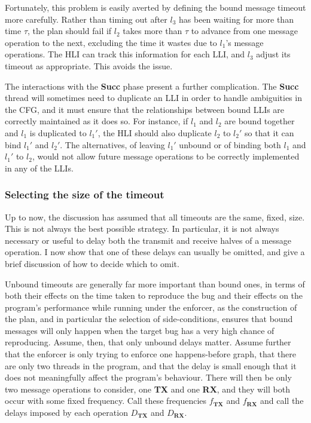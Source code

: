 Fortunately, this problem is easily averted by defining the bound
message timeout more carefully.  Rather than timing out after $l_3$
has been waiting for more than time $\tau$, the plan should fail if
$l_2$ takes more than $\tau$ to advance from one message operation to
the next, excluding the time it wastes due to $l_1$'s message
operations.  The HLI can track this information for each LLI, and
$l_3$ adjust its timeout as appropriate.  This avoids the
issue.

The interactions with the \textbf{Succ} phase present a further
complication.  The \textbf{Succ} thread will sometimes need to
duplicate an LLI in order to handle ambiguities in the CFG, and it
must ensure that the relationships between bound LLIs are correctly
maintained as it does so.  For instance, if $l_1$ and $l_2$ are bound
together and $l_1$ is duplicated to $l_1'$, the HLI should also
duplicate $l_2$ to $l_2'$ so that it can bind $l_1'$ and $l_2'$.  The
alternatives, of leaving $l_1'$ unbound or of binding both $l_1$ and
$l_1'$ to $l_2$, would not allow future message operations to be
correctly implemented in any of the LLIs.

\subsubsection{Selecting the size of the timeout}
\label{sect:using:timeout_balancing}


Up to now, the discussion has assumed that all timeouts are the same,
fixed, size.  This is not always the best possible strategy.  In
particular, it is not always necessary or useful to delay both the
transmit and receive halves of a message operation.  I now show that
one of these delays can usually be omitted, and give a brief
discussion of how to decide which to omit.

Unbound timeouts are generally far more important than bound ones, in
terms of both their effects on the time taken to reproduce the bug and
their effects on the program's performance while running under the
enforcer, as the construction of the plan, and in particular the
selection of side-conditions, ensures that bound messages will only
happen when the target bug has a very high chance of reproducing.
Assume, then, that only unbound delays matter.  Assume further that
the enforcer is only trying to enforce one happens-before graph, that
there are only two threads in the program, and that the delay is small
enough that it does not meaningfully affect the program's behaviour.
There will then be only two message operations to consider, one
\textbf{TX} and one \textbf{RX}, and they will both occur with some
fixed frequency.  Call these frequencies $f_{\mathbf{TX}}$ and
$f_{\mathbf{RX}}$ and call the delays imposed by each operation
$D_{\mathbf{TX}}$ and $D_{\mathbf{RX}}$.

